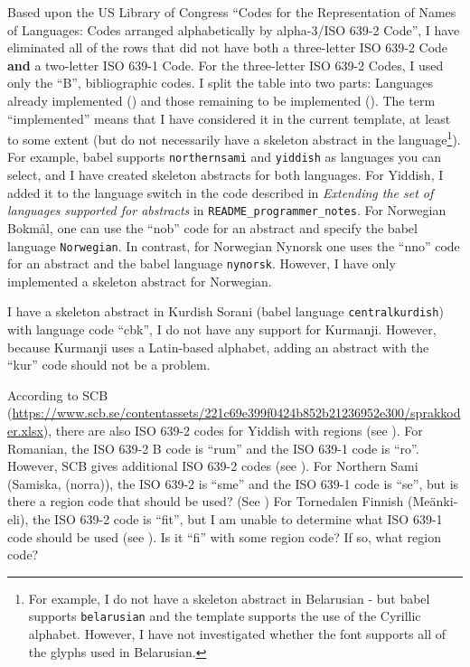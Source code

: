 \documentclass[12pt, twoside]{article}
\newcommand{\fname}[1]{\texttt{#1}}
\begin{document}
Based upon the US Library of Congress \enquote{Codes for the Representation of Names of Languages: Codes arranged alphabetically by alpha-3/ISO 639-2 Code}, I have eliminated all of the rows that did not have both a three-letter \gls{ISO} 639-2 Code \textbf{and} a two-letter \gls{ISO} 639-1 Code. For the three-letter \gls{ISO} 639-2 Codes, I used only the  \enquote{B}, \ie bibliographic codes. I split the table into two parts: Languages already implemented () and those remaining to be implemented (). The term \enquote{implemented} means that I have considered it in the current template, at least to some extent (but do not necessarily have a skeleton abstract in the language\footnote{For example, I do not have a skeleton abstract in Belarusian - but babel supports \texttt{belarusian} and the template supports the use of the Cyrillic alphabet. However, I have not investigated whether the font supports all of the glyphs used in Belarusian.}).  For example, babel supports \texttt{northernsami} and \texttt{yiddish} as languages you can select, and I have created skeleton abstracts for both languages. For Yiddish, I added it to the language switch in the code described in \textit{Extending the set of languages supported for abstracts} in \fname{README\_programmer\_notes}. For Norwegian Bokmål, one can use the \enquote{nob} code for an abstract and specify the babel language \texttt{Norwegian}. In contrast, for Norwegian Nynorsk one uses the \enquote{nno} code for an abstract and the babel language \texttt{nynorsk}. However, I have only implemented a skeleton abstract for Norwegian.

I have a skeleton abstract in Kurdish Sorani (babel language \texttt{centralkurdish}) with language code \enquote{cbk}, I do not have any support for Kurmanji. However, because Kurmanji uses a Latin-based alphabet, adding an abstract with the \enquote{kur} code should not be a problem.

According to SCB (\url{https://www.scb.se/contentassets/221c69e399f0424b852b21236952e300/sprakkoder.xlsx}), there are also \gls{ISO} 639-2 codes for Yiddish with regions (see ). For Romanian, the \gls{ISO} 639-2 B code is \enquote{rum} and the ISO 639-1 code is  \enquote{ro}. However, SCB gives additional \gls{ISO} 639-2 codes (see ). For Northern Sami (Samiska, (norra)), the \gls{ISO} 639-2 is \enquote{sme} and the ISO 639-1 code is \enquote{se}, but is there a region code that should be used? (See ) For Tornedalen Finnish (\foreignlanguage{swedish}{Meänkieli}), the ISO 639-2 code is \enquote{fit}, but I am unable to determine what \gls{ISO} 639-1 code should be used (see ). Is it \enquote{fi} with some region code? If so, what region code? 
\end{document}
